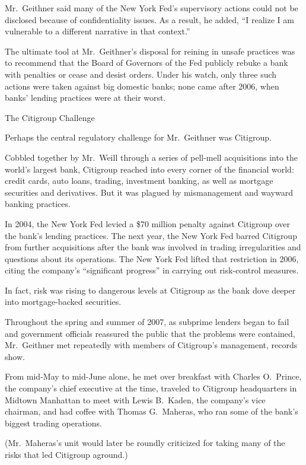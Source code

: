 \documentclass[12pt,a4paper,onecolumn]{article}
\begin{document}
Mr.~Geithner said many of the New York Fed's supervisory actions could not be disclosed because of
confidentiality issues. As a result, he added, ``I realize I am vulnerable to a different narrative
in that context.''

The ultimate tool at Mr.~Geithner's disposal for reining in unsafe practices was to recommend that
the Board of Governors of the Fed publicly rebuke a bank with penalties or cease and desist orders.
Under his watch, only three such actions were taken against big domestic banks; none came after
2006, when banks' lending practices were at their worst.

The Citigroup Challenge

Perhaps the central regulatory challenge for Mr.~Geithner was Citigroup.

Cobbled together by Mr.~Weill through a series of pell-mell acquisitions into the world's largest
bank, Citigroup reached into every corner of the financial world: credit cards, auto loans, trading,
investment banking, as well as mortgage securities and derivatives. But it was plagued by
mismanagement and wayward banking practices.

In 2004, the New York Fed levied a \$70 million penalty against Citigroup over the bank's lending
practices. The next year, the New York Fed barred Citigroup from further acquisitions after the bank
was involved in trading irregularities and questions about its operations. The New York Fed lifted
that restriction in 2006, citing the company's ``significant progress'' in carrying out risk-control
measures.

In fact, risk was rising to dangerous levels at Citigroup as the bank dove deeper into
mortgage-backed securities.

Throughout the spring and summer of 2007, as subprime lenders began to fail and government officials
reassured the public that the problems were contained, Mr.~Geithner met repeatedly with members of
Citigroup's management, records show.

From mid-May to mid-June alone, he met over breakfast with Charles O.~Prince, the company's chief
executive at the time, traveled to Citigroup headquarters in Midtown Manhattan to meet with Lewis
B.~Kaden, the company's vice chairman, and had coffee with Thomas G.~Maheras, who ran some of the
bank's biggest trading operations.

(Mr.~Maheras's unit would later be roundly criticized for taking many of the risks that led
Citigroup aground.)
\end{document}
